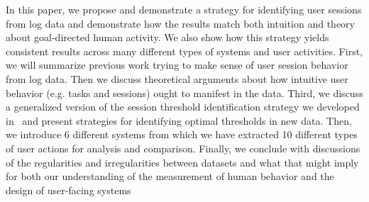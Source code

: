 In this paper, we propose and demonstrate a strategy for identifying user sessions from log data and demonstrate how the results match both intuition and theory about goal-directed human activity.  We also show how this strategy yields consistent results across many different types of systems and user activities.  First, we will summarize previous work trying to make sense of user session behavior from log data.  Then we discuss theoretical arguments about how intuitive user behavior (e.g. tasks and sessions) ought to manifest in the data.  Third, we discuss a generalized version of the session threshold identification strategy we developed in~\cite{geiger2013using} and present strategies for identifying optimal thresholds in new data.  Then, we introduce 6 different systems from which we have extracted 10 different types of user actions for analysis and comparison. Finally, we conclude with discussions of the regularities and irregularities between datasets and what that might imply for both our understanding of the measurement of human behavior and the design of user-facing systems
